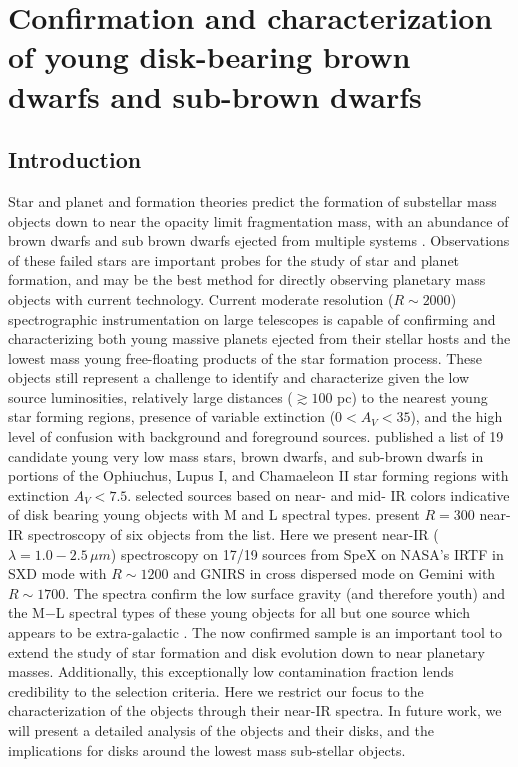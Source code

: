 \chapter{Confirmation and characterization of young disk-bearing brown dwarfs and sub-brown dwarfs}

\section{Introduction}
Star and planet and formation theories predict the formation of substellar mass objects down to near the opacity limit fragmentation mass, with an abundance of brown dwarfs and sub brown dwarfs ejected from multiple systems \citep{bate02,bate09}.  Observations of these failed stars are important probes for the study of star and planet formation, and may be the best method for directly observing planetary mass objects with current technology.  Current moderate resolution ($R\sim2000$) spectrographic instrumentation on large telescopes is capable of confirming and characterizing both young massive planets ejected from their stellar hosts and the lowest mass young free-floating products of the star formation process.  These objects still represent a challenge to identify and characterize given the low source luminosities, relatively large distances ($\gtrsim 100$ pc) to the nearest young star forming regions, presence of variable extinction ($0 < A_{V} < 35$), and the high level of confusion with background and foreground sources.  \citet{allers06} published a list of 19 candidate young very low mass stars, brown dwarfs, and sub-brown dwarfs in portions of the Ophiuchus, Lupus I, and Chamaeleon II star forming regions with extinction $A_{V} < 7.5$.  \citeauthor{allers06} selected sources based on near- and mid- IR colors indicative of disk bearing young objects with M and L spectral types.  \citet{allers07} present $R=300$ near-IR spectroscopy of six objects from the \citet{allers06} list.  Here we present near-IR ($\lambda=1.0-2.5 \,\mu m$) spectroscopy on 17/19 sources from SpeX on NASA's IRTF \citep{rayner03, cushing04, vacca03} in SXD mode with $R\sim1200$ and GNIRS \citep{elias1998,elias06} in cross dispersed mode on Gemini with $R\sim1700$.  The spectra confirm the low surface gravity (and therefore youth) and the M$-$L spectral types of these young objects for all but one source which appears to be extra-galactic \citep{rayjay06}.  The now confirmed sample is an important tool to extend the study of star formation and disk evolution down to near planetary masses.  Additionally, this exceptionally low contamination fraction lends credibility to the selection criteria.  Here we restrict our focus to the characterization of the objects through their near-IR spectra.  In future work, we will present a detailed analysis of the objects and their disks, and the implications for disks around the lowest mass sub-stellar objects.

